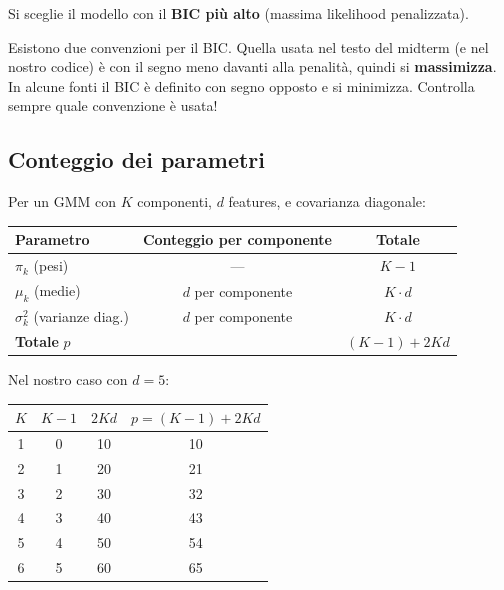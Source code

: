 \documentclass[11pt,a4paper]{article}
\begin{document}
Si sceglie il modello con il \textbf{BIC più alto} (massima likelihood
penalizzata).

\begin{warnbox}
Esistono due convenzioni per il BIC. Quella usata nel testo del midterm
(e nel nostro codice) è con il segno meno davanti alla penalità, quindi
si \textbf{massimizza}. In alcune fonti il BIC è definito con segno
opposto e si minimizza. Controlla sempre quale convenzione è usata!
\end{warnbox}

\subsection{Conteggio dei parametri}

Per un GMM con $K$ componenti, $d$ features, e covarianza diagonale:

\begin{center}
\renewcommand{\arraystretch}{1.3}
\begin{tabular}{lcc}
\toprule
\textbf{Parametro} & \textbf{Conteggio per componente} &
\textbf{Totale} \\
\midrule
$\pi_k$ (pesi) & --- & $K - 1$\footnotemark \\
$\mu_k$ (medie) & $d$ per componente & $K \cdot d$ \\
$\sigma_k^2$ (varianze diag.) & $d$ per componente & $K \cdot d$ \\
\midrule
\textbf{Totale} $p$ & & $(K-1) + 2Kd$ \\
\bottomrule
\end{tabular}
\end{center}

Nel nostro caso con $d=5$:

\begin{center}
\begin{tabular}{cccc}
\toprule
$K$ & $K-1$ & $2Kd$ & $p = (K-1)+2Kd$ \\
\midrule
1 & 0 & 10 & 10 \\
2 & 1 & 20 & 21 \\
3 & 2 & 30 & 32 \\
4 & 3 & 40 & 43 \\
5 & 4 & 50 & 54 \\
6 & 5 & 60 & 65 \\
\bottomrule
\end{tabular}
\end{center}
\end{document}
